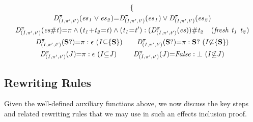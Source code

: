 \documentclass[acmsmall,review,anonymous]{acmart}\settopmatter{printfolios=true,printccs=false,printacmref=false}
\newcommand{\es}{\textcolor{black}{\ensuremath{{es}}}}
\newcommand{\choice}{\vee}
\newcommand{\code}[1]{{\tt{\ensuremath{\m{#1}}}}}
\newcommand{\empt}{\textcolor{black}{\ensuremath{\epsilon}}}
\newcommand{\bott}{\textcolor{black}{\ensuremath{\bot}}}
\newcommand{\m}{\mathit}
\begin{document}
\begin{definition}
\begin{gather*}
{\begin{cases}
    \end{cases} 
    }
 \\
\code{D^{\pi}_{(I, \pi^\prime, t^\prime)}(  \es_1 \choice \es_2) } {=} \code{ D^{\pi}_{(I, \pi^\prime, t^\prime)}(  \es_1) \choice D^{\pi}_{(I, \pi^\prime, t^\prime)}(  \es_2)} 
\\
\code{D^{\pi}_{(I, \pi^\prime, t^\prime)}(  \es \# t) } {=}
\code{
\pi \wedge(t_1{+} t_2 {=}t) \wedge (t_1{=}t^\prime) : (D^{\pi}_{(I, \pi^\prime, t^\prime)}(\es))\# t_2} \ \ \ 
\code{(fresh \ t_1\ t_2 )}
\\
\code{D^{\pi}_{(I, \pi^\prime, t^\prime)}(\textbf{S}?)} {=} \code{\pi: \empt\ (}\code{ I {\subseteq} \{\textbf{S}\})}
\qquad
\code{D^{\pi}_{(I, \pi^\prime, t^\prime)}(\textbf{S}?)} {=} \code{\pi: \textbf{S}?\ (}\code{ I {\not\subseteq} \{\textbf{S}\})}
\\
\code{D^{\pi}_{(I, \pi^\prime, t^\prime)}(J)} {=} \code{\pi: \empt\ (}\code{ I {\subseteq} J)}
\qquad\ 
    \code{D^{\pi}_{(I, \pi^\prime, t^\prime)}( J)} {=} \code{False : \bott \ (}\code{I {\not\subseteq} J)} 
\end{gather*}
\end{definition}




\subsection{Rewriting Rules}
\label{InferenceRules}
Given the well-defined auxiliary functions above, we now discuss the key steps and related rewriting rules that we may use in such an effects inclusion proof.  
\end{document}
